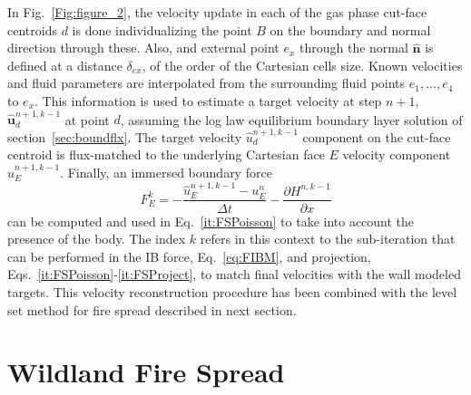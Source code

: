 \documentclass[journal,article,atmosphere,submit,moreauthors,pdftex]{Definitions/mdpi}
\begin{document}
In Fig.~\ref{Fig:figure_2}, the velocity update in each of the gas phase cut-face centroids $d$ is done individualizing the point $B$ on the boundary and normal direction through these. Also, and external point $e_x$ through the normal $\mathbf{\hat{n}}$ is defined at a distance $\delta_{ex}$, of the order of the Cartesian cells size. Known velocities and fluid parameters are interpolated from the surrounding fluid points $e_1,\dots,e_4$ to $e_x$.
This information is used to estimate a target velocity at step $n+1$, $\mathbf{\hat{u}}_d^{n+1,k-1}$ at point $d$, assuming the log law equilibrium boundary layer solution of section~\ref{sec:boundflx}. The target velocity $\hat{u}_d^{n+1,k-1}$ component on the cut-face centroid is flux-matched to the underlying Cartesian face $E$ velocity component $\hat{u}_E^{n+1,k-1}$. Finally, an immersed boundary force
\begin{equation}
F_E^k=-\frac{\hat{u}_E^{n+1,k-1}-u_E^{n}}{\Delta t} - \frac{\partial H^{n,k-1}}{\partial x}
\label{eq:FIBM}
\end{equation}
can be computed and used in Eq.~\eqref{it:FSPoisson} to take into account the presence of the body. The index $k$ refers in this context to the sub-iteration that can be performed in the IB force, Eq.~\eqref{eq:FIBM}, and projection, Eqs.~\eqref{it:FSPoisson}-\eqref{it:FSProject}, to match final velocities with the wall modeled targets. This velocity reconstruction procedure has been combined with the level set method for fire spread described in next section.


\section{Wildland Fire Spread} \label{sec:firespread}
\end{document}

